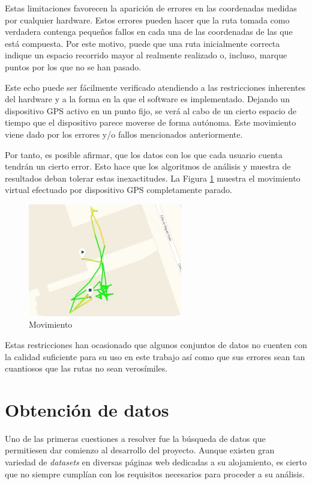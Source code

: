 Estas limitaciones favorecen la aparición de errores en las coordenadas medidas por cualquier hardware. Estos errores pueden hacer que la ruta tomada como verdadera contenga pequeños fallos en cada una de las coordenadas de las que está compuesta. Por este motivo, puede que una ruta inicialmente correcta indique un espacio recorrido mayor al realmente realizado o, incluso, marque puntos por los que no se han pasado.

Este echo puede ser fácilmente verificado atendiendo a las restricciones inherentes del hardware y a la forma en la que el software es implementado. Dejando un dispositivo GPS activo en un punto fijo, se verá al cabo de un cierto espacio de tiempo que el dispositivo parece moverse de forma autónoma. Este movimiento viene dado por los errores y/o fallos mencionados anteriormente.

Por tanto, es posible afirmar, que los datos con los que cada usuario cuenta tendrán un cierto error. Esto hace que los algoritmos de análisis y muestra de resultados deban tolerar estas inexactitudes. La Figura \ref{errores} muestra el movimiento virtual efectuado por dispositivo GPS completamente parado. \cite{pais:info}

\begin{figure}[h]
  \centering
    \includegraphics[width=0.6\textwidth]{../img/gps/errores.jpg}
  \caption{Movimiento }
  \label{errores}
\end{figure}

Estas restricciones han ocasionado que algunos conjuntos de datos no cuenten con la calidad suficiente para su uso en este trabajo así como que sus errores sean tan cuantiosos que las rutas no sean verosímiles.

\section{Obtención de datos}
Uno de las primeras cuestiones a resolver fue la búsqueda de datos que permitiesen dar comienzo al desarrollo del proyecto. Aunque existen gran variedad de \textit{datasets} en diversas páginas web dedicadas a su alojamiento, es cierto que no siempre cumplían con los requisitos necesarios para proceder a su análisis.


